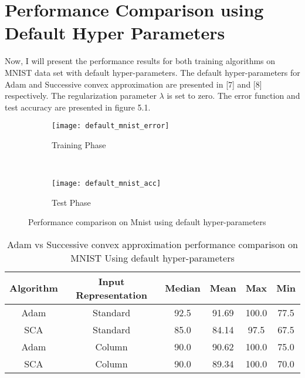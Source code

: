 \section {Performance Comparison using Default Hyper Parameters}

Now, I will present the performance results for both training algorithms on MNIST data set with default hyper-parameters. The default hyper-parameters for Adam and Successive convex approximation are presented in [7] and [8] respectively. The regularization parameter $\lambda$ is set to zero. The error function and test accuracy are presented in figure 5.1.
 
\begin{figure*}[t!]
    \centering
    \begin{subfigure}[t]{0.5\textwidth}
        \centering
        \texttt{[image: default\_mnist\_error]}
        \caption{Training Phase}
    \end{subfigure}%
    ~ 
    \begin{subfigure}[t]{0.5\textwidth}
        \centering
        \texttt{[image: default\_mnist\_acc]}
        \caption{Test Phase}
    \end{subfigure}
    \caption{Performance comparison on Mnist using default hyper-parameters}
\end{figure*} 

\begin{table}
\begin{center}
 \begin{tabular}{||c|| c ||c|| c|| c|| c||} 
 \hline
 Algorithm & Input Representation & Median & Mean & Max & Min \\ [0.5ex] 
 \hline\hline
 Adam & Standard & 92.5 & 91.69 & 100.0 & 77.5 \\ 
 \hline
 SCA & Standard & 85.0 & 84.14 & 97.5 & 67.5 \\
 \hline
 Adam & Column & 90.0 & 90.62 & 100.0 & 75.0\\
 \hline
 SCA & Column & 90.0 & 89.34 & 100.0 & 70.0  \\
 \hline
\end{tabular}
\end{center}
\caption{Adam vs Successive convex approximation performance comparison on MNIST Using default hyper-parameters}
\end{table}

